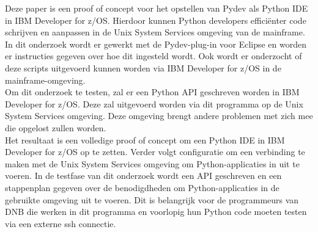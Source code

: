 Deze paper is een proof of concept voor het opstellen van Pydev als Python IDE in IBM Developer for z/OS. Hierdoor kunnen Python developers efficiënter code schrijven en aanpassen in de Unix System Services omgeving van de mainframe. \\

In dit onderzoek wordt er gewerkt met de Pydev-plug-in voor Eclipse en worden er instructies gegeven over hoe dit ingesteld wordt. Ook wordt er onderzocht of deze scripts uitgevoerd kunnen worden via IBM Developer for z/OS in de mainframe-omgeving. \\

Om dit onderzoek te testen, zal er een Python API geschreven worden in IBM Developer for z/OS. Deze zal uitgevoerd worden via dit programma op de Unix System Services omgeving. Deze omgeving brengt andere problemen met zich mee die opgelost zullen worden. \\

Het resultaat is een volledige proof of concept om een Python IDE in IBM Developer for z/OS op te zetten. Verder volgt configuratie om een verbinding te maken met de Unix System Services omgeving om Python-applicaties in uit te voeren. In de testfase van dit onderzoek wordt een API geschreven en een stappenplan gegeven over de benodigdheden om Python-applicaties in de gebruikte omgeving uit te voeren. Dit is belangrijk voor de programmeurs van DNB die werken in dit programma en voorlopig hun Python code moeten testen via een externe ssh connectie.
